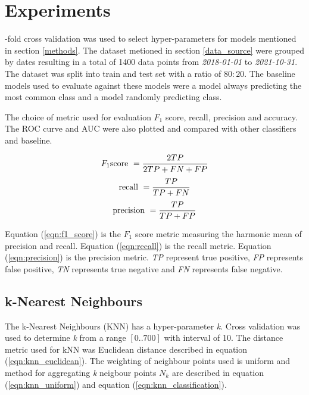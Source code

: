 \documentclass[transmag]{IEEEtran}
\begin{document}
\section{Experiments}
-fold cross validation was used to select hyper-parameters for models mentioned in section \ref{methods}. The dataset metioned in section \ref{data_source} were grouped by dates resulting in a total of 1400 data points from \emph{2018-01-01} to \emph{2021-10-31}. The dataset was split into train and test set with a ratio of $80:20$. The baseline models used to evaluate against these models were a model always predicting the most common class and a model randomly predicting class.

\label{sec:metric}
\noindent The choice of metric used for evaluation $F_1$ score, recall, precision and accuracy. The ROC curve and AUC were also plotted and compared with other classifiers and baseline.

\begin{equation}
\label{eqn:f1_score}
F_1 \textnormal{score}\ = \frac{2TP}{2TP+FN+FP}
\end{equation}
\begin{equation}
\label{eqn:recall}
\textnormal{recall}\ = \frac{TP}{TP+FN}
\end{equation}
\begin{equation}
\label{eqn:precision}
\textnormal{precision}\ = \frac{TP}{TP+FP}
\end{equation}

\noindent Equation (\ref{eqn:f1_score}) is the $F_1$ score metric measuring the harmonic mean of precision and recall. Equation (\ref{eqn:recall}) is the recall metric. Equation (\ref{eqn:precision}) is the precision metric. \emph{TP} represent true positive, \emph{FP} represents false positive, \emph{TN} represents true negative and \emph{FN} represents false negative.

\subsection{k-Nearest Neighbours}
\noindent The k-Nearest Neighbours (KNN) has a hyper-parameter \emph{k}. Cross validation was used to determine \emph{k} from a range $[0..700]$ with interval of 10. The distance metric used for kNN was Euclidean distance described in equation (\ref{eqn:knn_euclidean}). The weighting of neighbour points used is uniform and method for aggregating \emph{k} neigbour points $N_k$ are described in equation (\ref{eqn:knn_uniform}) and equation (\ref{eqn:knn_classification}).
\end{document}
